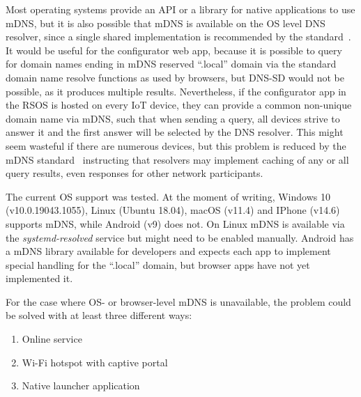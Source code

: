 
Most operating systems provide an API or a library for native applications to use mDNS, but it is also possible that mDNS is available on the OS level DNS resolver, since a single shared implementation is recommended by the standard~\cite{Multicast_DNS_RFC6762}. It would be useful for the configurator web app, because it is possible to query for domain names ending in mDNS reserved ``.local'' domain via the standard domain name resolve functions as used by browsers, but DNS-SD would not be possible, as it produces multiple results. Nevertheless, if the configurator app in the RSOS is hosted on every IoT device, they can provide a common non-unique domain name via mDNS, such that when sending a query, all devices strive to answer it and the first answer will be selected by the DNS resolver. This might seem wasteful if there are numerous devices, but this problem is reduced by the mDNS standard~\cite{Multicast_DNS_RFC6762} instructing that resolvers may implement caching of any or all query results, even responses for other network participants.

The current OS support was tested. At the moment of writing, Windows 10 (v10.0.19043.1055), Linux (Ubuntu 18.04), macOS (v11.4) and IPhone (v14.6) supports mDNS, while Android (v9) does not. On Linux mDNS is available via the \emph{systemd-resolved} service but might need to be enabled manually. Android has a mDNS library available for developers and expects each app to implement special handling for the ``.local'' domain, but browser apps have not yet implemented it. 

For the case where OS- or browser-level mDNS is unavailable, the problem could be solved with at least three different ways:
\begin{enumerate}
  \item Online service
  \item Wi-Fi hotspot with captive portal
  \item Native launcher application
\end{enumerate}

